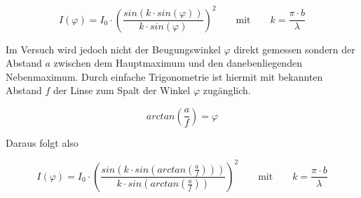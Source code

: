 \begin{equation}
I(\varphi)=I_0 \cdot\left(\frac{sin(k\cdot sin(\varphi) )}{k\cdot sin(\varphi)}\right)^2 \quad \quad \text{mit} \quad \quad k =\frac{\pi \cdot b}{\lambda }
\end{equation}






Im Versuch wird jedoch nicht der Beugungswinkel $\varphi$ direkt gemessen sondern der Abstand $a$ zwischen dem Hauptmaximum und den danebenliegenden Nebenmaximum. Durch einfache Trigonometrie ist hiermit mit bekannten Abstand $f$ der Linse zum Spalt der Winkel $\varphi$ zugänglich.


\begin{equation}
arctan\left(\frac{a}{f}\right)=\varphi
\end{equation}

Daraus folgt also 

\begin{equation}
I\left(\varphi\right)=I_0 \cdot\left(\frac{sin\left(k\cdot sin\left(arctan\left(\frac{a}{f}\right)\right) \right)}{k\cdot sin\left(arctan\left(\frac{a}{f}\right)\right)}\right)^2 \quad \quad \text{mit} \quad \quad k =\frac{\pi \cdot b}{\lambda }
\end{equation}


